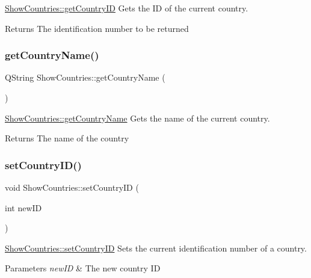 \mbox{\hyperlink{class_show_countries_a02956713871e89645487500f3c9b77b8}{Show\+Countries\+::get\+Country\+ID}} Gets the ID of the current country. 

\begin{DoxyReturn}{Returns}
The identification number to be returned 
\end{DoxyReturn}
\mbox{\label{class_show_countries_afc6d5f6817bd4c9388aef3d52d09d768}} 
\subsubsection{\texorpdfstring{getCountryName()}{getCountryName()}}
{\footnotesize\ttfamily Q\+String Show\+Countries\+::get\+Country\+Name (\begin{DoxyParamCaption}{ }\end{DoxyParamCaption})}



\mbox{\hyperlink{class_show_countries_afc6d5f6817bd4c9388aef3d52d09d768}{Show\+Countries\+::get\+Country\+Name}} Gets the name of the current country. 

\begin{DoxyReturn}{Returns}
The name of the country 
\end{DoxyReturn}
\mbox{\label{class_show_countries_a751b9d3c6859102f48d3ecc254135906}} 
\subsubsection{\texorpdfstring{setCountryID()}{setCountryID()}}
{\footnotesize\ttfamily void Show\+Countries\+::set\+Country\+ID (\begin{DoxyParamCaption}\item[{int}]{new\+ID }\end{DoxyParamCaption})}



\mbox{\hyperlink{class_show_countries_a751b9d3c6859102f48d3ecc254135906}{Show\+Countries\+::set\+Country\+ID}} Sets the current identification number of a country. 


\begin{DoxyParams}{Parameters}
{\em new\+ID} & The new country ID \\
\hline
\end{DoxyParams}
\mbox{\label{class_show_countries_aefa9daeff484f4028ea5a280b280dd36}} 
